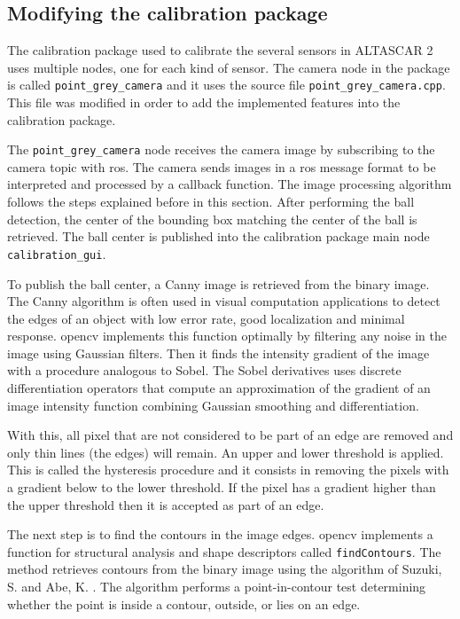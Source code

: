 \subsection{Modifying the calibration package}

The calibration package used to calibrate the several sensors in ALTASCAR 2 uses multiple nodes, one for each kind of sensor. The camera node in the package is called \texttt{point\_grey\_camera} and it uses the source file \texttt{point\_grey\_camera.cpp}. This file was modified in order to add the implemented features into the calibration package. 

The \texttt{point\_grey\_camera} node receives the camera image by subscribing to the camera topic with \gls{ros}. The camera sends images in a \gls{ros} message format to be interpreted and processed by a callback function. The image processing algorithm follows the steps explained before in this section. After performing the ball detection, the center of the bounding box matching the center of the ball is retrieved. The ball center is published into the calibration package main node \texttt{calibration\_gui}.

To publish the ball center, a Canny image is retrieved from the binary image. The Canny algorithm is often used in visual computation applications to detect the edges of an object with low error rate, good localization and minimal response. \gls{opencv} implements this function optimally by filtering any noise in the image using Gaussian filters. \cite{OpenCV2.4.13.6documentationa} Then it finds the intensity gradient of the image with a procedure analogous to Sobel. The Sobel derivatives uses discrete differentiation operators that compute an approximation of the gradient of an image intensity function combining Gaussian smoothing and differentiation. \cite{OpenCV2.4.13.6documentationb} 

With this, all pixel that are not considered to be part of an edge are removed and only thin lines (the edges) will remain. An upper and lower threshold is applied. This is called the hysteresis procedure and it consists in removing the pixels with a gradient below to the lower threshold. If the pixel has a gradient higher than the upper threshold then it is accepted as part of an edge.

The next step is to find the contours in the image edges. \gls{opencv} implements a function for structural analysis and shape descriptors called \texttt{findContours}. The method retrieves contours from the binary image using the algorithm of Suzuki, S. and Abe, K. \cite{Suzuki1985}. The algorithm performs a point-in-contour test determining whether the point is inside a contour, outside, or lies on an edge. 

